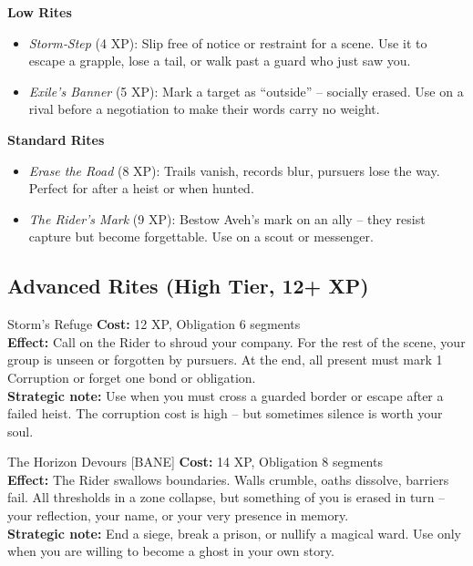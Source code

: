 \documentclass[10pt,a5paper]{book}
\begin{document}
\textbf{Low Rites}
\begin{itemize}
    \item \textit{Storm‑Step} (4 XP): Slip free of notice or restraint for a scene. Use it to escape a grapple, lose a tail, or walk past a guard who just saw you.
    \item \textit{Exile’s Banner} (5 XP): Mark a target as “outside” – socially erased. Use on a rival before a negotiation to make their words carry no weight.
\end{itemize}

\textbf{Standard Rites}
\begin{itemize}
    \item \textit{Erase the Road} (8 XP): Trails vanish, records blur, pursuers lose the way. Perfect for after a heist or when hunted.
    \item \textit{The Rider’s Mark} (9 XP): Bestow Aveh’s mark on an ally – they resist capture but become forgettable. Use on a scout or messenger.
\end{itemize}

\subsection*{Advanced Rites (High Tier, 12+ XP)}

\begin{patronbox}{Storm’s Refuge}
\textbf{Cost:} 12 XP, Obligation 6 segments \\
\textbf{Effect:} Call on the Rider to shroud your company. For the rest of the scene, your group is unseen or forgotten by pursuers. At the end, all present must mark 1 Corruption or forget one bond or obligation. \\
\textbf{Strategic note:} Use when you must cross a guarded border or escape after a failed heist. The corruption cost is high – but sometimes silence is worth your soul.
\end{patronbox}

\begin{patronbox}{The Horizon Devours [BANE]}
\textbf{Cost:} 14 XP, Obligation 8 segments \\
\textbf{Effect:} The Rider swallows boundaries. Walls crumble, oaths dissolve, barriers fail. All thresholds in a zone collapse, but something of you is erased in turn – your reflection, your name, or your very presence in memory. \\
\textbf{Strategic note:} End a siege, break a prison, or nullify a magical ward. Use only when you are willing to become a ghost in your own story.
\end{patronbox}
\end{document}
